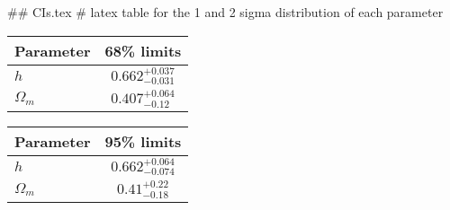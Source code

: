 ## CIs.tex
# latex table for the 1 and 2 sigma distribution of each parameter

\begin{tabular} { l  c}
 Parameter &  68\% limits\\
\hline
{\boldmath$h              $} & $0.662^{+0.037}_{-0.031}   $\\
{\boldmath$\Omega_m       $} & $0.407^{+0.064}_{-0.12}    $\\
\hline
\end{tabular}

\begin{tabular} { l  c}
 Parameter &  95\% limits\\
\hline
{\boldmath$h              $} & $0.662^{+0.064}_{-0.074}   $\\
{\boldmath$\Omega_m       $} & $0.41^{+0.22}_{-0.18}      $\\
\hline
\end{tabular}
